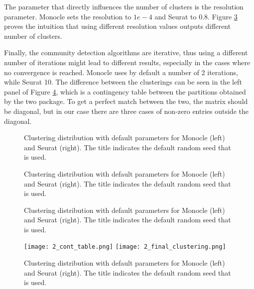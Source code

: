 The parameter that directly influences the number of clusters is the resolution parameter. Monocle sets the resolution to $1e-4$ and Seurat to $0.8$. Figure \ref{fig:s4-m3-res} proves the intuition that using different resolution values outputs different number of clusters.

Finally, the community detection algorithms are iterative, thus using a different number of iterations might lead to different results, especially in the cases where no convergence is reached. Monocle uses by default a number of 2 iterations, while Seurat 10. The difference between the clusterings can be seen in the left panel of Figure \ref{fig:s4-m3-cont}, which is a contingency table between the partitions obtained by the two package. To get a perfect match between the two, the matrix should be diagonal, but in our case there are three cases of non-zero entries outside the diagonal.

\begin{figure}[H]
    \centering
    \caption{\label{fig:s4-m3-graph-alg}Clustering distribution with default parameters for Monocle (left) and Seurat (right). The title indicates the default random seed that is used.}
\end{figure}

\begin{figure}[H]
    \centering
    \caption{\label{fig:s4-m3-quality}Clustering distribution with default parameters for Monocle (left) and Seurat (right). The title indicates the default random seed that is used.}
\end{figure}

\begin{figure}[H]
    \centering
    \caption{\label{fig:s4-m3-res}Clustering distribution with default parameters for Monocle (left) and Seurat (right). The title indicates the default random seed that is used.}
\end{figure}


\begin{figure}[H]
    \centering
    \texttt{[image: 2\_cont\_table.png]}
    \texttt{[image: 2\_final\_clustering.png]}
    \caption{\label{fig:s4-m3-cont}Clustering distribution with default parameters for Monocle (left) and Seurat (right). The title indicates the default random seed that is used.}
\end{figure}

